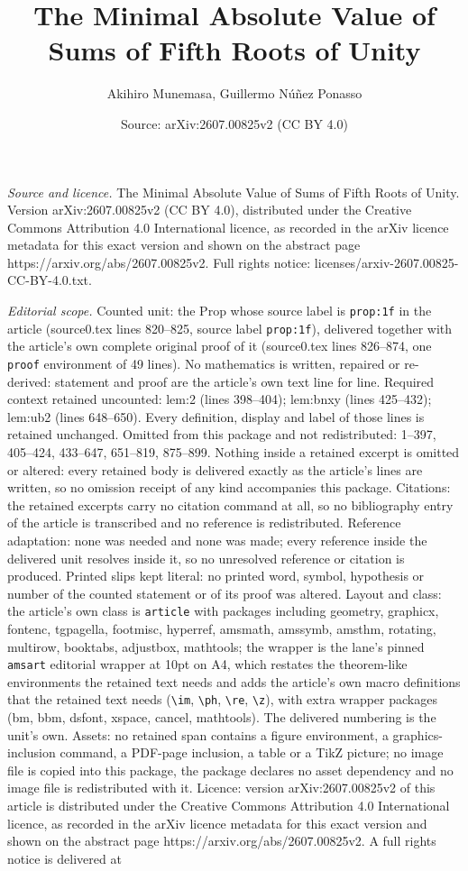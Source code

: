 \documentclass[10pt,a4paper]{amsart}
\title[The Minimal Absolute Value of Sums of Fifth Roots of Unity]{The Minimal Absolute Value of Sums of Fifth Roots of Unity}
\author{Akihiro Munemasa, Guillermo N\'u\~nez Ponasso}
\date{Source: arXiv:2607.00825v2 (CC BY 4.0)}
\begin{document}
\maketitle

\noindent\emph{Source and licence.} The Minimal Absolute Value of Sums of Fifth Roots of Unity. Version arXiv:2607.00825v2 (CC BY 4.0), distributed under the Creative Commons Attribution 4.0 International licence, as recorded in the arXiv licence metadata for this exact version and shown on the abstract page https://arxiv.org/abs/2607.00825v2. Full rights notice: licenses/arxiv-2607.00825-CC-BY-4.0.txt.\par\smallskip

\noindent\textit{Editorial scope.} Counted unit: the Prop whose source label is \texttt{prop:1f} in the article (source0.tex lines 820--825, source label \texttt{prop:1f}), delivered together with the article's own complete original proof of it (source0.tex lines 826--874, one \texttt{proof} environment of 49 lines). No mathematics is written, repaired or re-derived: statement and proof are the article's own text line for line. Required context retained uncounted: lem:2 (lines 398--404); lem:bnxy (lines 425--432); lem:ub2 (lines 648--650). Every definition, display and label of those lines is retained unchanged. Omitted from this package and not redistributed: 1--397, 405--424, 433--647, 651--819, 875--899. Nothing inside a retained excerpt is omitted or altered: every retained body is delivered exactly as the article's lines are written, so no omission receipt of any kind accompanies this package. Citations: the retained excerpts carry no citation command at all, so no bibliography entry of the article is transcribed and no reference is redistributed. Reference adaptation: none was needed and none was made; every reference inside the delivered unit resolves inside it, so no unresolved reference or citation is produced. Printed slips kept literal: no printed word, symbol, hypothesis or number of the counted statement or of its proof was altered. Layout and class: the article's own class is \texttt{article} with packages including geometry, graphicx, fontenc, tgpagella, footmisc, hyperref, amsmath, amssymb, amsthm, rotating, multirow, booktabs, adjustbox, mathtools; the wrapper is the lane's pinned \texttt{amsart} editorial wrapper at 10pt on A4, which restates the theorem-like environments the retained text needs and adds the article's own macro definitions that the retained text needs (\texttt{\textbackslash im}, \texttt{\textbackslash ph}, \texttt{\textbackslash re}, \texttt{\textbackslash z}), with extra wrapper packages (bm, bbm, dsfont, xspace, cancel, mathtools). The delivered numbering is the unit's own. Assets: no retained span contains a figure environment, a graphics-inclusion command, a PDF-page inclusion, a table or a TikZ picture; no image file is copied into this package, the package declares no asset dependency and no image file is redistributed with it. Licence: version arXiv:2607.00825v2 of this article is distributed under the Creative Commons Attribution 4.0 International licence, as recorded in the arXiv licence metadata for this exact version and shown on the abstract page https://arxiv.org/abs/2607.00825v2. A full rights notice is delivered at 
\end{document}

